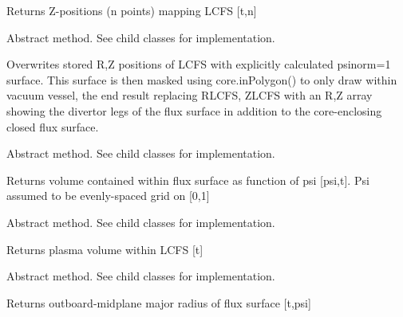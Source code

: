 \documentclass[letterpaper,10pt,english]{sphinxmanual}
\begin{document}
\begin{fulllineitems}
\begin{fulllineitems}
Returns Z-positions (n points) mapping LCFS {[}t,n{]}

\end{fulllineitems}


\begin{fulllineitems}
\label{eqtools:eqtools.core.Equilibrium.remapLCFS}
Abstract method.  See child classes for implementation.

Overwrites stored R,Z positions of LCFS with explicitly calculated psinorm=1
surface.  This surface is then masked using core.inPolygon() to only draw within
vacuum vessel, the end result replacing RLCFS, ZLCFS with an R,Z array showing
the divertor legs of the flux surface in addition to the core-enclosing closed
flux surface.

\end{fulllineitems}


\begin{fulllineitems}
\label{eqtools:eqtools.core.Equilibrium.getFluxVol}
Abstract method.  See child classes for implementation.

Returns volume contained within flux surface as function of psi {[}psi,t{]}.
Psi assumed to be evenly-spaced grid on {[}0,1{]}

\end{fulllineitems}


\begin{fulllineitems}
\label{eqtools:eqtools.core.Equilibrium.getVolLCFS}
Abstract method.  See child classes for implementation.

Returns plasma volume within LCFS {[}t{]}

\end{fulllineitems}


\begin{fulllineitems}
\label{eqtools:eqtools.core.Equilibrium.getRmidPsi}
Abstract method.  See child classes for implementation.

Returns outboard-midplane major radius of flux surface {[}t,psi{]}


\end{fulllineitems}
\end{fulllineitems}
\end{document}
